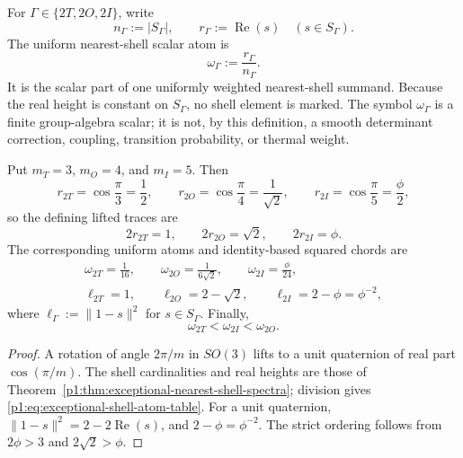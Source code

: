 \documentclass[11pt]{article}
\begin{document}
\begin{definition}
\label{p1:def:exceptional-shell-scalar-atom}
For \(\Gamma\in\{2T,2O,2I\}\), write
\[
 n_\Gamma:=|S_\Gamma|,
 \qquad
 r_\Gamma:=\operatorname{Re}(s)\quad(s\in S_\Gamma).
\]
The uniform nearest-shell scalar atom is
\begin{equation}
\label{p1:eq:exceptional-shell-scalar-atom}
 \boxed{\omega_\Gamma:=\frac{r_\Gamma}{n_\Gamma}.}
\end{equation}
It is the scalar part of one uniformly weighted nearest-shell summand.
Because the real height is constant on \(S_\Gamma\), no shell element is
marked.  The symbol \(\omega_\Gamma\) is a finite group-algebra scalar; it is
not, by this definition, a smooth determinant correction, coupling,
transition probability, or thermal weight.
\end{definition}

\begin{theorem}
\label{p1:thm:exceptional-345-shell-table}
Put \(m_T=3\), \(m_O=4\), and \(m_I=5\).  Then
\begin{equation}
\label{p1:eq:exceptional-345-real-height}
 r_{2T}=\cos\frac{\pi}{3}=\frac12,\qquad
 r_{2O}=\cos\frac{\pi}{4}=\frac1{\sqrt2},\qquad
 r_{2I}=\cos\frac{\pi}{5}=\frac{\phi}{2},
\end{equation}
so the defining lifted traces are
\begin{equation}
\label{p1:eq:exceptional-345-lifted-trace}
 \boxed{2r_{2T}=1,\qquad2r_{2O}=\sqrt2,\qquad2r_{2I}=\phi.}
\end{equation}
The corresponding uniform atoms and identity-based squared chords are
\begin{align}
\label{p1:eq:exceptional-shell-atom-table}
 \boxed{\omega_{2T}=\frac1{16},\qquad
 \omega_{2O}=\frac1{6\sqrt2},\qquad
 \omega_{2I}=\frac{\phi}{24},}\\
\label{p1:eq:exceptional-nearest-chords}
 \boxed{\ell_{2T}=1,\qquad
 \ell_{2O}=2-\sqrt2,\qquad
 \ell_{2I}=2-\phi=\phi^{-2},}
\end{align}
where \(\ell_\Gamma:=\|1-s\|^2\) for \(s\in S_\Gamma\).  Finally,
\begin{equation}
\label{p1:eq:exceptional-shell-atom-order}
 \boxed{\omega_{2T}<\omega_{2I}<\omega_{2O}.}
\end{equation}
\end{theorem}

\begin{proof}
A rotation of angle \(2\pi/m\) in \(SO(3)\) lifts to a unit quaternion of
real part \(\cos(\pi/m)\).  The shell cardinalities and real heights are those
of Theorem~\ref{p1:thm:exceptional-nearest-shell-spectra}; division gives
\eqref{p1:eq:exceptional-shell-atom-table}.  For a unit quaternion,
\(\|1-s\|^2=2-2\operatorname{Re}(s)\), and
\(2-\phi=\phi^{-2}\).  The strict ordering follows from
\(2\phi>3\) and \(2\sqrt2>\phi\).
\end{proof}
\end{document}
